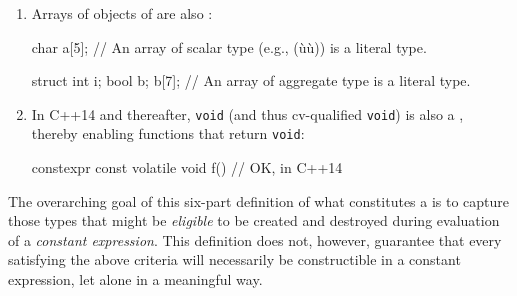 \begin{enumerate}
\item{Arrays of objects of  are also :

\begin{emcppslisting}
char a[5];  // An array of scalar type (e.g., (ù{}ù)) is a literal type.

struct { int i; bool b; } b[7];
    // An array of aggregate type is a literal type.
\end{emcppslisting}
}    

\item{In C++14 and thereafter, \lstinline!void! (and thus cv-qualified \lstinline!void!) is also a , thereby enabling functions that return \lstinline!void!:

\begin{emcppslisting}[emcppsstandards={c++14}]
constexpr const volatile void f() { }  // OK, in C++14
\end{emcppslisting}
} 
\end{enumerate}   

The overarching goal of this six-part definition of what constitutes a
 is to capture those types that might be
\emph{eligible} to be created and destroyed during evaluation of a
\emph{constant expression}. This definition does not, however, guarantee
that every  satisfying the above criteria will
necessarily be constructible in a constant expression, let alone in a
meaningful way.

